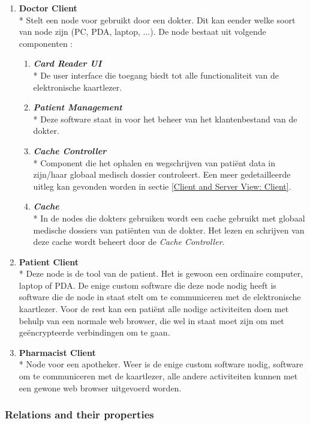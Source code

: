 \documentclass[a4paper,10pt]{article}
\begin{document}
\begin{enumerate}
\item \textbf{Doctor Client}\\*
Stelt een node voor gebruikt door een dokter. Dit kan eender welke soort van node zijn (PC, PDA, laptop, ...). De node bestaat uit volgende componenten : 
\begin{enumerate}
 \item \textit{\textbf{Card Reader UI}}\\*
De user interface die toegang biedt tot alle functionaliteit van de elektronische kaartlezer.
\item \textit{\textbf{Patient Management}}\\*
Deze software staat in voor het beheer van het klantenbestand van de dokter.
\item \textit{\textbf{Cache Controller}}\\*
Component die het ophalen en wegschrijven van patiënt data in zijn/haar globaal medisch dossier controleert. Een meer gedetailleerde uitleg kan gevonden worden in sectie \ref{Client and Server View: Client}.
\item \textit{\textbf{Cache}}\\*
In de nodes die dokters gebruiken wordt een cache gebruikt met globaal medische dossiers van patiënten van de dokter. Het lezen en schrijven van deze cache wordt beheert door de \textit{Cache Controller}.
\end{enumerate}

\item \textbf{Patient Client}\\*
Deze node is de tool van de patient. Het is gewoon een ordinaire computer, laptop of PDA. De enige custom software die deze node nodig heeft is software die de node in staat stelt om te communiceren met de elektronische kaartlezer. Voor de rest kan een patiënt alle nodige activiteiten doen met behulp van een normale web browser, die wel in staat moet zijn om met geëncrypteerde verbindingen om te gaan.

\item \textbf{Pharmacist Client}\\*
Node voor een apotheker. Weer is de enige custom software nodig, software om te communiceren met de kaartlezer, alle andere activiteiten kunnen met een gewone web browser uitgevoerd worden.

\end{enumerate}


\subsubsection{Relations and their properties}
\end{document}
